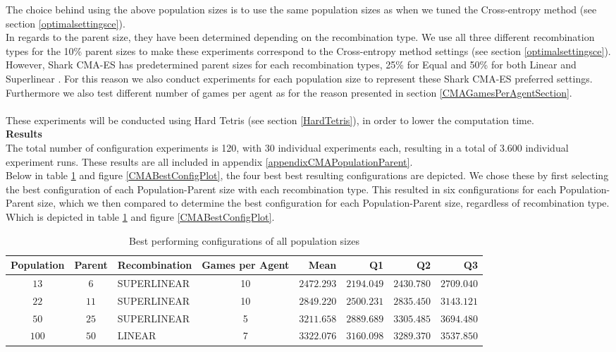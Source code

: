 The choice behind using the above population sizes is to use the same population sizes as
when we tuned the Cross-entropy method (see section \ref{optimalsettingsce}).\\
In regards to the parent size, they have been determined depending on the recombination type.
We use all three different recombination types for the 10\% parent sizes to make these experiments
correspond to the Cross-entropy method settings (see section \ref{optimalsettingsce}). However, Shark CMA-ES
has predetermined parent sizes for each recombination types, 25\% for Equal and 50\% for both
Linear and Superlinear \citep{shark08}. For this reason we also conduct experiments for each population
size to represent these Shark CMA-ES preferred settings.
Furthermore we also test different number of games per agent as for the reason presented in section \ref{CMAGamesPerAgentSection}.\\\\
These experiments will be conducted using Hard Tetris (see section \ref{HardTetris}), in order
to lower the computation time.\\

\textbf{Results}\\
The total number of configuration experiments is 120, with 30 individual experiments each,
resulting in a total of 3.600 individual experiment runs. These results are all included in 
appendix \ref{appendixCMAPopulationParent}.\\
Below in table \ref{CMABestConfigTable} and figure \ref{CMABestConfigPlot}, the four best
best resulting configurations are depicted. We chose these by first selecting the best 
configuration of each Population-Parent size with each recombination type. This resulted in six
configurations for each Population-Parent size, which we then compared to determine the best
configuration for each Population-Parent size, regardless of recombination type. Which is depicted in table \ref{CMABestConfigTable} and figure \ref{CMABestConfigPlot}.

\begin{table}[H]
\centering
\small
\begin{tabular}{c c l c r r r r}
Population & Parent & Recombination & Games per Agent & Mean & Q1 & Q2 & Q3\\
\hline
$13$ & $6$  & SUPERLINEAR & 10 & $2472.293$ & $2194.049$ & $2430.780$ & $2709.040$\\
$22$ & $11$ & SUPERLINEAR & 10 & $2849.220$ & $2500.231$ & $2835.450$ & $3143.121$\\
$50$ & $25$ & SUPERLINEAR & 5  & $3211.658$ & $2889.689$ & $3305.485$ & $3694.480$\\
$100$ & $50$ & LINEAR     & 7  & $3322.076$ & $3160.098$ & $3289.370$ & $3537.850$
\end{tabular}
\caption{Best performing configurations of all population sizes \label{CMABestConfigTable}}
\end{table}

